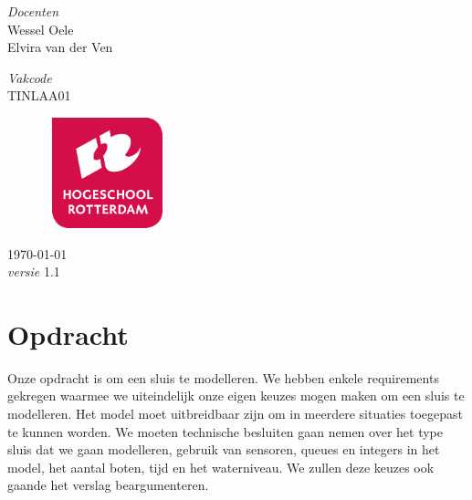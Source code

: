 \documentclass[oneside]{scrbook}
\begin{document}
\begin{titlepage}
	
	{\large\textit{Docenten}}\\
    Wessel Oele \\
    Elvira van der Ven
    
    {\large\textit{Vakcode}}\\
    TINLAA01
    
	
	\begin{figure}[H]
    \centering
    \includegraphics[width=3.7cm,height=3.2cm]{logohr.png}
    \end{figure}
	
	
	\vfill\vfill\vfill %
	
	{\large\today} \\ %
	{\large\textit{versie}} 1.1\\  %
	 
	
	\vfill %
	
\end{titlepage}


\chapter{Opdracht}
Onze opdracht is om een sluis te modelleren. We hebben enkele requirements gekregen waarmee we uiteindelijk onze eigen keuzes mogen maken om een sluis te modelleren. Het model moet uitbreidbaar zijn om in meerdere situaties toegepast te kunnen worden. We moeten technische besluiten gaan nemen over het type sluis dat we gaan modelleren, gebruik van sensoren, queues en integers in het model, het aantal boten, tijd en het waterniveau. We zullen deze keuzes ook gaande het verslag beargumenteren.
\listoffigures
\end{document}
